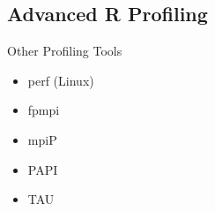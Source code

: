 \subsection{Advanced R Profiling}
\makesubcontentsslidessec

\begin{frame}
  \begin{block}{Other Profiling Tools}
    \begin{itemize}
      \item perf (Linux)
      \item fpmpi
      \item mpiP
      \item PAPI
      \item TAU
    \end{itemize}
  \end{block}
\end{frame}


